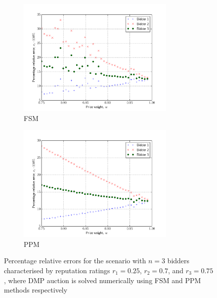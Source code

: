 \begin{figure}[p!]
  \setcounter{subfigure}{0}
  \begin{subfigure}[b]{0.5\textwidth}
    \includegraphics[width=3in]{Approximation/Figures/compare_3_bidders_025_070_075}
    \caption{FSM}
    \label{fig:compare_3_bidders_025_070_075_fsm_approximation}
  \end{subfigure}
  \begin{subfigure}[b]{0.5\textwidth}
    \includegraphics[width=3in]{Approximation/Figures/compare_3_bidders_025_070_075_ppm}
    \caption{PPM}
    \label{fig:compare_3_bidders_025_070_075_ppm_approximation}
  \end{subfigure}
  \caption{Percentage relative errors for the scenario with $n=3$ bidders characterised by reputation ratings $r_1=0.25$, $r_2=0.7$, and $r_3=0.75$, where DMP auction is solved numerically using FSM and PPM methods respectively}
  \label{fig:compare_3_bidders_025_070_075_approximation}
\end{figure}

